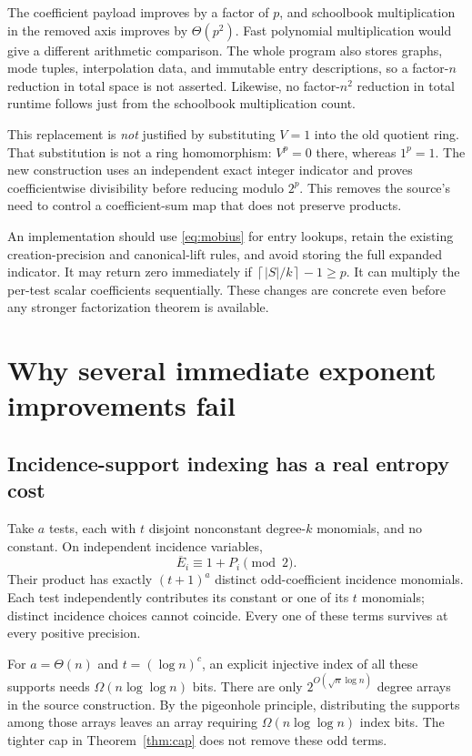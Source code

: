 \documentclass[11pt]{article}
\theoremstyle{definition}
\theoremstyle{remark}
\newcommand{\ceil}[1]{\left\lceil #1\right\rceil}
\begin{document}
The coefficient payload improves by a factor of $p$, and schoolbook
multiplication in the removed axis improves by $\Theta(p^2)$. Fast polynomial
multiplication would give a different arithmetic comparison. The whole program
also stores graphs, mode tuples, interpolation data, and immutable entry
descriptions, so a factor-$n$ reduction in total space is not asserted.
Likewise, no factor-$n^2$ reduction in total runtime follows just from the
schoolbook multiplication count.

This replacement is \emph{not} justified by substituting $V=1$ into the old
quotient ring. That substitution is not a ring homomorphism: $V^p=0$ there,
whereas $1^p=1$. The new construction uses an independent exact integer
indicator and proves coefficientwise divisibility before reducing modulo
$2^p$. This removes the source's need to control a coefficient-sum map that
does not preserve products.

An implementation should use \eqref{eq:mobius} for entry lookups, retain
the existing creation-precision and canonical-lift rules, and avoid storing
the full expanded indicator. It may return zero immediately if
$\ceil{|S|/k}-1\ge p$. It can multiply the per-test scalar coefficients
sequentially. These changes are concrete even before any stronger
factorization theorem is available.

\section{Why several immediate exponent improvements fail}\label{sec:barriers}

\subsection{Incidence-support indexing has a real entropy cost}
Take $a$ tests, each with $t$ disjoint nonconstant degree-$k$ monomials, and no
constant. On independent incidence variables,
\[
 \overline E_i\equiv1+P_i\pmod2.
\]
Their product has exactly $(t+1)^a$ distinct odd-coefficient incidence
monomials. Each test independently contributes its constant or one of its $t$
monomials; distinct incidence choices cannot coincide. Every one of these
terms survives at every positive precision.

For $a=\Theta(n)$ and $t=(\log n)^c$, an explicit injective index of all
these supports needs $\Omega(n\log\log n)$ bits. There are only
$2^{O(\sqrt n\log n)}$ degree arrays in the source construction. By the
pigeonhole principle, distributing the supports among those arrays leaves an
array requiring $\Omega(n\log\log n)$ index bits. The tighter cap in
Theorem~\ref{thm:cap} does not remove these odd terms.
\end{document}

